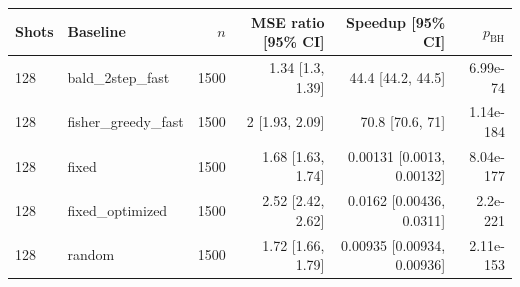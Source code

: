\begin{tabular}{llrrrr}
\toprule
Shots & Baseline & $n$ & MSE ratio [95\% CI] & Speedup [95\% CI] & $p_{\mathrm{BH}}$ \\
\midrule
128 & bald\_2step\_fast & 1500 & 1.34 [1.3, 1.39] & 44.4 [44.2, 44.5] & 6.99e-74 \\
128 & fisher\_greedy\_fast & 1500 & 2 [1.93, 2.09] & 70.8 [70.6, 71] & 1.14e-184 \\
128 & fixed & 1500 & 1.68 [1.63, 1.74] & 0.00131 [0.0013, 0.00132] & 8.04e-177 \\
128 & fixed\_optimized & 1500 & 2.52 [2.42, 2.62] & 0.0162 [0.00436, 0.0311] & 2.2e-221 \\
128 & random & 1500 & 1.72 [1.66, 1.79] & 0.00935 [0.00934, 0.00936] & 2.11e-153 \\
\bottomrule
\end{tabular}
